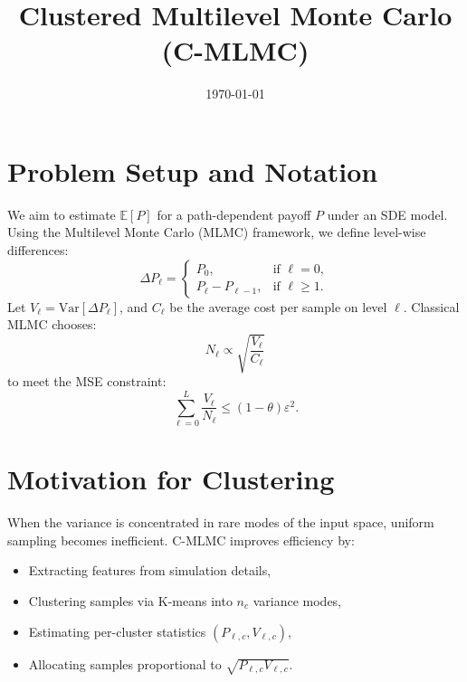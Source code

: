 \documentclass{article}
\title{Clustered Multilevel Monte Carlo (C-MLMC)}
\date{\today}
\begin{document}
\maketitle

\section{Problem Setup and Notation}
We aim to estimate \( \mathbb{E}[P] \) for a path-dependent payoff \( P \) under an SDE model. Using the Multilevel Monte Carlo (MLMC) framework, we define level-wise differences:
\[
\Delta P_\ell =
\begin{cases}
P_0, & \text{if } \ell = 0, \\
P_\ell - P_{\ell-1}, & \text{if } \ell \ge 1.
\end{cases}
\]
Let \( V_\ell = \mathrm{Var}[\Delta P_\ell] \), and \( C_\ell \) be the average cost per sample on level \( \ell \). Classical MLMC chooses:
\[
N_\ell \propto \sqrt{\frac{V_\ell}{C_\ell}}
\]
to meet the MSE constraint:
\[
\sum_{\ell=0}^L \frac{V_\ell}{N_\ell} \le (1 - \theta)\varepsilon^2.
\]

\section{Motivation for Clustering}
When the variance is concentrated in rare modes of the input space, uniform sampling becomes inefficient. C-MLMC improves efficiency by:
\begin{itemize}
  \item Extracting features from simulation details,
  \item Clustering samples via K-means into \( n_c \) variance modes,
  \item Estimating per-cluster statistics \( (P_{\ell,c}, V_{\ell,c}) \),
  \item Allocating samples proportional to \( \sqrt{P_{\ell,c} V_{\ell,c}} \).
\end{itemize}
\end{document}
